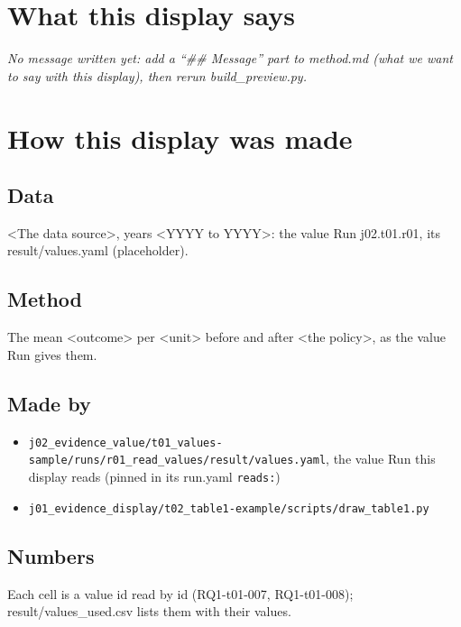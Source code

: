 \documentclass[12pt]{article}
\begin{document}
\makeatletter\renewcommand{\fps@figure}{H}\renewcommand{\fps@table}{H}\makeatother
\renewcommand{\figurename}{Figure}\renewcommand{\tablename}{Table}\renewcommand{\thefigure}{1}\renewcommand{\thetable}{1}
{}
\clearpage
\section*{What this display says}
\emph{No message written yet: add a ``\#\# Message'' part to method.md (what we want to say with this display), then rerun build\_preview.py.}
\section*{How this display was made}
\subsection*{Data}
<The data source>, years <YYYY to YYYY>: the value Run j02.t01.r01, its result/values.yaml (placeholder).

\subsection*{Method}
The mean <outcome> per <unit> before and after <the policy>, as the value Run gives them.

\subsection*{Made by}
\begin{itemize}\item \texttt{j02\_evidence\_value/t01\_values-sample/runs/r01\_read\_values/result/values.yaml}, the value Run this display reads (pinned in its run.yaml \texttt{reads:})
\item \texttt{j01\_evidence\_display/t02\_table1-example/scripts/draw\_table1.py}
\end{itemize}
\subsection*{Numbers}
Each cell is a value id read by id (RQ1-t01-007, RQ1-t01-008); result/values\_used.csv lists them with their values.
\end{document}

